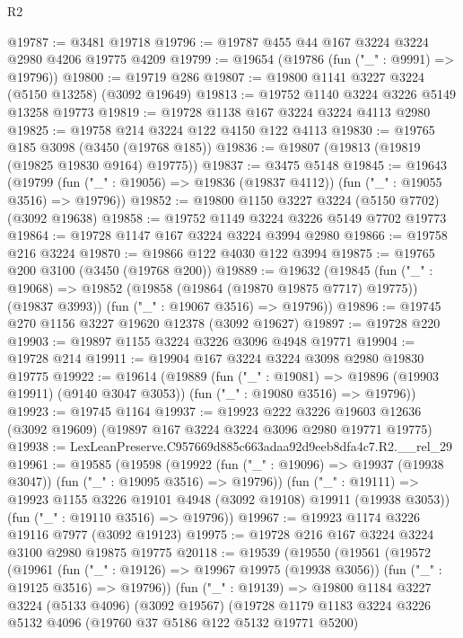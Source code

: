\begin{lexlean}{R2}
\begin{coremodule}
@19787 := @3481 @19718
@19796 := @19787 @455 @44 @167 @3224 @3224 @2980 @4206 @19775 @4209
@19799 := @19654 (@19786 (fun ("_" : @9991) => @19796))
@19800 := @19719 @286
@19807 := @19800 @1141 @3227 @3224 (@5150 @13258) (@3092 @19649)
@19813 := @19752 @1140 @3224 @3226 @5149 @13258 @19773
@19819 := @19728 @1138 @167 @3224 @3224 @4113 @2980
@19825 := @19758 @214 @3224 @122 @4150 @122 @4113
@19830 := @19765 @185 @3098 (@3450 (@19768 @185))
@19836 := @19807 (@19813 (@19819 (@19825 @19830 @9164) @19775))
@19837 := @3475 @5148
@19845 := @19643
    (@19799 (fun ("_" : @19056) => @19836 (@19837 @4112)) (fun ("_" : @19055 @3516) => @19796))
@19852 := @19800 @1150 @3227 @3224 (@5150 @7702) (@3092 @19638)
@19858 := @19752 @1149 @3224 @3226 @5149 @7702 @19773
@19864 := @19728 @1147 @167 @3224 @3224 @3994 @2980
@19866 := @19758 @216 @3224
@19870 := @19866 @122 @4030 @122 @3994
@19875 := @19765 @200 @3100 (@3450 (@19768 @200))
@19889 := @19632
    (@19845
      (fun ("_" : @19068) => @19852 (@19858 (@19864 (@19870 @19875 @7717) @19775)) (@19837 @3993))
      (fun ("_" : @19067 @3516) => @19796))
@19896 := @19745 @270 @1156 @3227 @19620 @12378 (@3092 @19627)
@19897 := @19728 @220
@19903 := @19897 @1155 @3224 @3226 @3096 @4948 @19771
@19904 := @19728 @214
@19911 := @19904 @167 @3224 @3224 @3098 @2980 @19830 @19775
@19922 := @19614
    (@19889
      (fun ("_" : @19081) => @19896 (@19903 @19911) (@9140 @3047 @3053))
      (fun ("_" : @19080 @3516) => @19796))
@19923 := @19745 @1164
@19937 := @19923
    @222
    @3226
    @19603
    @12636
    (@3092 @19609)
    (@19897 @167 @3224 @3224 @3096 @2980 @19771 @19775)
@19938 := LexLeanPreserve.C957669d885c663adaa92d9eeb8dfa4c7.R2.__rel_29
@19961 := @19585
    (@19598
      (@19922 (fun ("_" : @19096) => @19937 (@19938 @3047)) (fun ("_" : @19095 @3516) => @19796))
      (fun ("_" : @19111) => @19923 @1155 @3226 @19101 @4948 (@3092 @19108) @19911 (@19938 @3053))
      (fun ("_" : @19110 @3516) => @19796))
@19967 := @19923 @1174 @3226 @19116 @7977 (@3092 @19123)
@19975 := @19728 @216 @167 @3224 @3224 @3100 @2980 @19875 @19775
@20118 := @19539
    (@19550
      (@19561
        (@19572
          (@19961
            (fun ("_" : @19126) => @19967 @19975 (@19938 @3056))
            (fun ("_" : @19125 @3516) => @19796))
          (fun ("_" : @19139) =>
          @19800
            @1184
            @3227
            @3224
            (@5133 @4096)
            (@3092 @19567)
            (@19728
              @1179
              @1183
              @3224
              @3226
              @5132
              @4096
              (@19760 @37 @5186 @122 @5132 @19771 @5200)

\end{coremodule}
\end{lexlean}
